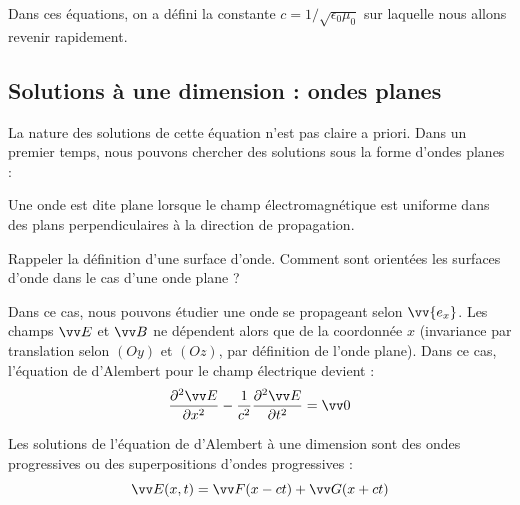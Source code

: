 \documentclass[11pt,fleqn]{book} %
\begin{document}
Dans ces équations, on a défini la constante $c = 1/\sqrt{\epsilon_0 \mu_0}$ sur laquelle nous allons revenir rapidement.

\subsection{Solutions à une dimension : ondes planes}

La nature des solutions de cette équation n'est pas claire a priori. Dans un premier temps, nous pouvons chercher des solutions sous la forme d'ondes planes :

\begin{definition}
	Une onde est dite plane lorsque le champ électromagnétique est uniforme dans des plans perpendiculaires à la direction de propagation. 
\end{definition}

\begin{capex}
	Rappeler la définition d'une surface d'onde. Comment sont orientées les surfaces d'onde dans le cas d'une onde plane ?
\end{capex}

Dans ce cas, nous pouvons étudier une onde se propageant selon $\vv{e_x}$. Les champs $\vv E$ et $\vv B$ ne dépendent alors que de la coordonnée $x$ (invariance par translation selon $(Oy)$ et $(Oz)$, par définition de l'onde plane). Dans ce cas, l'équation de d'Alembert pour le champ électrique devient :
\begin{equation}
	\frac{\partial^2 \vv E}{\partial x^2} - \frac{1}{c^2} \frac{\partial^2 \vv E}{\partial t^2} = \vv 0
\end{equation}

\begin{theorem}
	Les solutions de l'équation de d'Alembert à une dimension sont des ondes progressives ou des superpositions d'ondes progressives :
	\begin{equation}
		\vv E(x,t) = \vv F(x - ct) + \vv G(x+ct)
	\end{equation}
\end{theorem}
\end{document}
